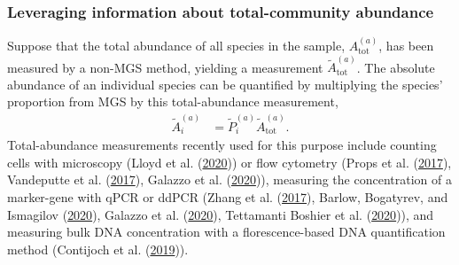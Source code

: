 \documentclass[
]{article}
\begin{document}
\hypertarget{leveraging-information-about-total-community-abundance}{%
\subsubsection{Leveraging information about total-community abundance}\label{leveraging-information-about-total-community-abundance}}

Suppose that the total abundance of all species in the sample, \(A_{{\text{tot}}}^{(a)}\), has been measured by a non-MGS method, yielding a measurement \(\tilde A_{\text{tot}}^{(a)}\).
The absolute abundance of an individual species can be quantified by multiplying the species' proportion from MGS by this total-abundance measurement,
\begin{align}
  \label{eq:density-prop-meas}
  \tilde A_i^{(a)} &= \tilde P_i^{(a)} \tilde A_{\text{tot}}^{(a)}.
\end{align}
Total-abundance measurements recently used for this purpose include counting cells with microscopy (Lloyd et al. (\protect\hyperlink{ref-lloyd2020evid}{2020})) or flow cytometry (Props et al. (\protect\hyperlink{ref-props2017abso}{2017}), Vandeputte et al. (\protect\hyperlink{ref-vandeputte2017quan}{2017}), Galazzo et al. (\protect\hyperlink{ref-galazzo2020howt}{2020})), measuring the concentration of a marker-gene with qPCR or ddPCR (Zhang et al. (\protect\hyperlink{ref-zhang2017soil}{2017}), Barlow, Bogatyrev, and Ismagilov (\protect\hyperlink{ref-barlow2020aqau}{2020}), Galazzo et al. (\protect\hyperlink{ref-galazzo2020howt}{2020}), Tettamanti Boshier et al. (\protect\hyperlink{ref-tettamantiboshier2020comp}{2020})), and measuring bulk DNA concentration with a florescence-based DNA quantification method (Contijoch et al. (\protect\hyperlink{ref-contijoch2019gutm}{2019})).
\end{document}
